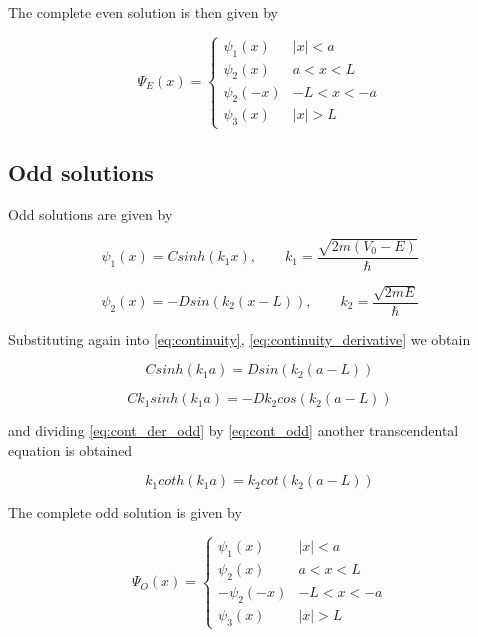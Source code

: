 \documentclass{article}
\begin{document}
The complete even solution is then given by

\begin{equation}
\Psi_{E}(x) = 
  \begin{cases} 
      \psi_{1}(x) & \left|x\right| < a \\
      \psi_{2}(x) & a < x < L \\
      \psi_{2}(-x) & -L < x < -a \\
      \psi_{3}(x) & \left|x\right| > L
   \end{cases}
\end{equation}

\subsection{Odd solutions}
Odd solutions are given by

\begin{equation}
\psi_{1}(x) = C sinh(k_{1} x), \qquad k_{1} = \frac{\sqrt{2m(V_{0} - E)}}{\hbar}
\end{equation}

\begin{equation}
\psi_{2}(x) = - D sin(k_{2}(x-L)), \qquad k_{2} = \frac{\sqrt{2mE}}{\hbar}
\end{equation}

Substituting again into \eqref{eq:continuity}, \eqref{eq:continuity_derivative} we obtain

\begin{equation}
\label{eq:cont_odd}
C sinh(k_{1}a) =  D sin(k_{2}(a-L))
\end{equation}

\begin{equation}
\label{eq:cont_der_odd}
C k_{1} sinh(k_{1}a) =  - D k_{2} cos(k_{2}(a-L))
\end{equation}

and dividing \eqref{eq:cont_der_odd} by \eqref{eq:cont_odd} another transcendental equation is obtained

\begin{equation}
\label{eq:trans_odd}
k_{1} coth(k_{1}a) = k_{2} cot(k_{2}(a-L))
\end{equation}

The complete odd solution is given by

\begin{equation}
\Psi_{O}(x) = 
  \begin{cases} 
      \psi_{1}(x) & \left|x\right| < a \\
      \psi_{2}(x) & a < x < L \\
      -\psi_{2}(-x) & -L < x < -a \\
      \psi_{3}(x) & \left|x\right| > L
   \end{cases}
\end{equation}
\end{document}

